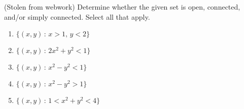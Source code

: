 \documentclass{ximera}
\begin{document}
\begin{problem}
(Stolen from webwork) Determine whether the given set is open, connected, and/or simply connected. Select all that apply.
\begin{enumerate}
\item $\{(x,y)\,:\,x>1,\,y<2\}$
\begin{selectAll}
  \end{selectAll}
\item $\{(x,y)\,:\,2x^2+y^2<1\}$
\begin{selectAll}
  \end{selectAll}
  \item $\{(x,y)\,:\,x^2-y^2<1\}$
\begin{selectAll}
  \end{selectAll}
  \item $\{(x,y)\,:\,x^2-y^2>1\}$
\begin{selectAll}
  \end{selectAll}
  \item $\{(x,y)\,:\,1<x^2+y^2<4\}$
\begin{selectAll}
  \end{selectAll}
\end{enumerate}
\end{problem}
\end{document}
